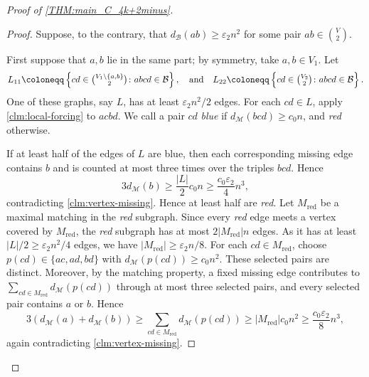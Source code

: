 \documentclass[10pt,a4paper]{article}
\theoremstyle{plain}
\theoremstyle{definition}
\begin{document}
\begin{proof}[Proof of \cref{THM:main_C_4k+2minus}]
\begin{proof}
Suppose, to the contrary, that $d_{\mathcal B}(ab)\ge\varepsilon_2n^2$ for some pair $ab \in \binom V2$.

First suppose that $a,b$ lie in the same part; by symmetry, take $a,b\in V_1$. Let
\[
L_{11}\coloneqq\left\{cd\in\tbinom{V_1\setminus\{a,b\}}2\colon abcd\in\mathcal B\right\},
\quad\text{and}\quad 
L_{22}\coloneqq\left\{cd\in\tbinom{V_2}2\colon abcd\in\mathcal B\right\}.
\]
One of these graphs, say $L$, has at least $\varepsilon_2n^2/2$ edges. For each $cd\in L$, apply \cref{clm:local-forcing} to $acbd$. 
We call a pair $cd$ \emph{blue} if $d_{\mathcal M}(bcd)\ge c_0n$, and \emph{red} otherwise.

If at least half of the edges of $L$ are blue, then each corresponding missing edge contains $b$ and is counted at most three times over the triples $bcd$. Hence
\[
3d_{\mathcal M}(b)\ge \frac{|L|}{2}c_0n\ge \frac{c_0\varepsilon_2}{4}n^3,
\]
contradicting \cref{clm:vertex-missing}. Hence at least half are \emph{red}.
Let $M_{\mathrm{red}}$ be a maximal matching in the \emph{red} subgraph. Since every \emph{red} edge meets a vertex covered by $M_{\mathrm{red}}$, the \emph{red} subgraph has at most $2|M_{\mathrm{red}}|n$ edges. As it has at least $|L|/2\ge\varepsilon_2n^2/4$ edges, we have $|M_{\mathrm{red}}|\ge\varepsilon_2n/8$. For each $cd\in M_{\mathrm{red}}$, choose $p(cd)\in\{ac,ad,bd\}$ with $d_{\mathcal M}(p(cd))\ge c_0n^2$. These selected pairs are distinct. Moreover, by the matching property, a fixed missing edge contributes to $\sum_{cd\in M_{\mathrm{red}}}d_{\mathcal M}(p(cd))$ through at most three selected pairs, and every selected pair contains $a$ or $b$. Hence
\[
3(d_{\mathcal M}(a)+d_{\mathcal M}(b))
\ge \sum_{cd\in M_{\mathrm{red}}}d_{\mathcal M}(p(cd))
\ge |M_{\mathrm{red}}|c_0n^2
\ge \frac{c_0\varepsilon_2}{8}n^3,
\]
again contradicting \cref{clm:vertex-missing}.


\end{proof}
\end{proof}
\end{document}
